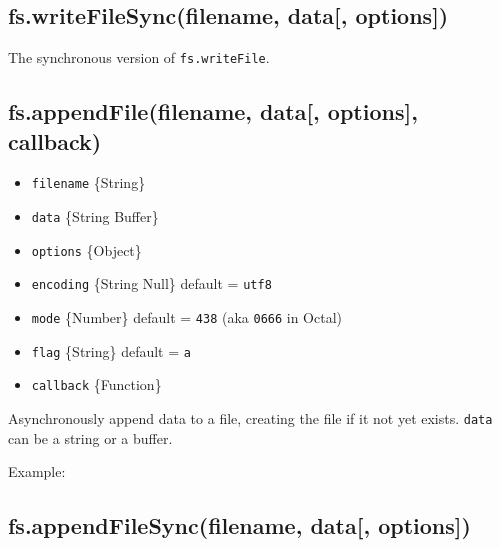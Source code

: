 \subsection{fs.writeFileSync(filename, data{[},
options{]})}\label{fs.writefilesyncfilename-data-options}

The synchronous version of \texttt{fs.writeFile}.

\subsection{fs.appendFile(filename, data{[}, options{]},
callback)}\label{fs.appendfilefilename-data-options-callback}

\begin{itemize}
\itemsep1pt\parskip0pt
\item
  \texttt{filename} \{String\}
\item
  \texttt{data} \{String \textbar{} Buffer\}
\item
  \texttt{options} \{Object\}
\item
  \texttt{encoding} \{String \textbar{} Null\} default =
  \texttt{\textquotesingle{}utf8\textquotesingle{}}
\item
  \texttt{mode} \{Number\} default = \texttt{438} (aka \texttt{0666} in
  Octal)
\item
  \texttt{flag} \{String\} default =
  \texttt{\textquotesingle{}a\textquotesingle{}}
\item
  \texttt{callback} \{Function\}
\end{itemize}

Asynchronously append data to a file, creating the file if it not yet
exists. \texttt{data} can be a string or a buffer.

Example:

\begin{Shaded}
\begin{Highlighting}[]
\NormalTok{(}\NormalTok{, }\NormalTok{, } 
    
  \NormalTok{(}\NormalTok{);}
\NormalTok{\});}
\end{Highlighting}
\end{Shaded}

\subsection{fs.appendFileSync(filename, data{[},
options{]})}\label{fs.appendfilesyncfilename-data-options}

